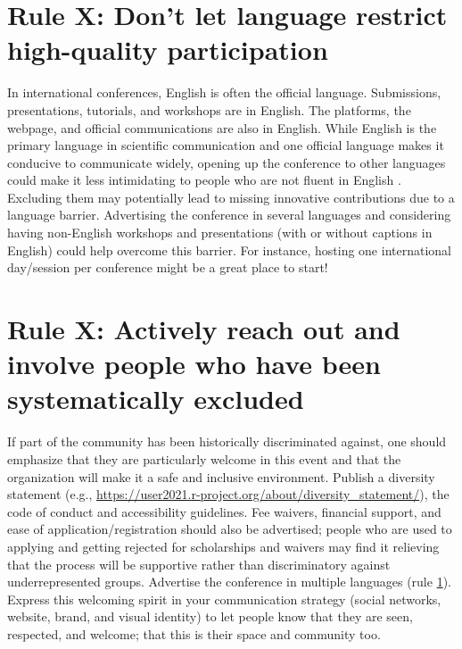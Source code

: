 \documentclass[10pt,letterpaper]{article}
\begin{document}
\section{Rule X: Don't let language restrict high-quality participation}
\label{rule_language}

In international conferences, English is often the official language. Submissions, presentations, tutorials, and workshops are in English. The platforms, the webpage, and official communications are also in English. While English is the primary language in scientific communication and one official language makes it conducive to communicate widely, opening up the conference to other languages could make it less intimidating to people who are not fluent in English \cite{ninerBetterWhomLeveling2021}. Excluding them may potentially lead to missing innovative contributions due to a language barrier. Advertising the conference in several languages and considering having non-English workshops and presentations (with or without captions in English) could help overcome this barrier. For instance, hosting one international day/session per conference might be a great place to start!


\section{Rule X: Actively reach out and involve people who have been systematically excluded}
\label{rule_communication}
If part of the community has been historically discriminated against, one should emphasize that they are particularly welcome in this event and that the organization will make it a safe and inclusive environment. Publish a diversity statement (e.g., \url{https://user2021.r-project.org/about/diversity_statement/}), the code of conduct and accessibility guidelines. Fee waivers, financial support, and ease of application/registration should also be advertised; people who are used to applying and getting rejected for scholarships and waivers may find it relieving that the process will be supportive rather than discriminatory against underrepresented groups. Advertise the conference in multiple languages (rule \ref{rule_language}). Express this welcoming spirit in your communication strategy (social networks, website, brand, and visual identity) to let people know that they are seen, respected, and welcome; that this is their space and community too. 
\end{document}
